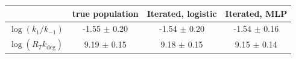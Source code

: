 \begin{tabular}{lccc}
\toprule
& true population & Iterated, logistic & Iterated, MLP \\
\midrule
$\log(k_1/k_{-1})$ & -1.55 $\pm$ 0.20 & -1.54 $\pm$ 0.20 & -1.54 $\pm$ 0.16 \\
$\log(R_T k_\mathrm{deg})$ & 9.19 $\pm$ 0.15 & 9.18 $\pm$ 0.15 & 9.15 $\pm$ 0.14 \\
\bottomrule
\end{tabular}
